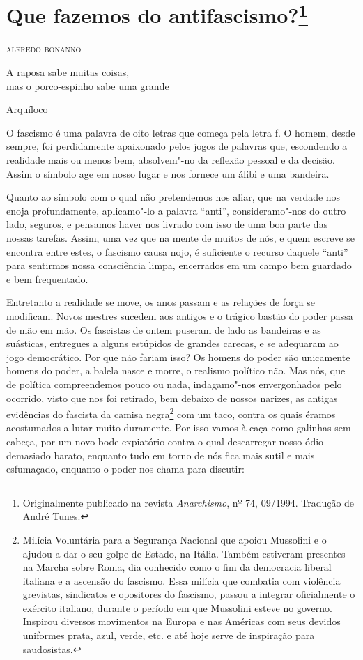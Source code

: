 \chapter{Que fazemos do antifascismo?\footnote[*]{Originalmente publicado na revista \emph{Anarchismo}, nº 74, 09/1994. Tradução de André Tunes.}}

\hfill{}\textsc{alfredo bonanno}

\bigskip

\epigraph{A raposa sabe muitas coisas,\\mas o porco-espinho sabe uma grande}{Arquíloco}


O fascismo é uma palavra de oito letras que começa pela letra f. O
homem, desde sempre, foi perdidamente apaixonado pelos jogos de palavras
que, escondendo a realidade mais ou menos bem, absolvem"-no da reflexão
pessoal e da decisão. Assim o símbolo age em nosso lugar e nos fornece
um álibi e uma bandeira.

Quanto ao símbolo com o qual não pretendemos nos aliar, que na verdade
nos enoja profundamente, aplicamo"-lo a palavra ``anti'', consideramo"-nos
do outro lado, seguros, e pensamos haver nos livrado com isso de uma boa
parte das nossas tarefas. Assim, uma vez que na mente de muitos de nós,
e quem escreve se encontra entre estes, o fascismo causa nojo, é
suficiente o recurso daquele ``anti'' para sentirmos nossa consciência
limpa, encerrados em um campo bem guardado e bem frequentado.

Entretanto a realidade se move, os anos passam e as relações de força se
modificam. Novos mestres sucedem aos antigos e o trágico bastão do poder
passa de mão em mão. Os fascistas de ontem puseram de lado as bandeiras
e as suásticas, entregues a alguns estúpidos de grandes carecas, e se
adequaram ao jogo democrático. Por que não fariam isso? Os homens do
poder são unicamente homens do poder, a balela nasce e morre, o realismo
político não. Mas nós, que de política compreendemos pouco ou nada,
indagamo"-nos envergonhados pelo ocorrido, visto que nos foi retirado,
bem debaixo de nossos narizes, as antigas evidências do fascista da
camisa negra\footnote{Milícia Voluntária para a Segurança Nacional que apoiou Mussolini e o
  ajudou a dar o seu golpe de Estado, na Itália. Também estiveram
  presentes na Marcha sobre Roma, dia conhecido como o fim da democracia
  liberal italiana e a ascensão do fascismo. Essa milícia que combatia
  com violência grevistas, sindicatos e opositores do fascismo, passou a
  integrar oficialmente o exército italiano, durante o período em que
  Mussolini esteve no governo. Inspirou diversos movimentos na Europa e
  nas Américas com seus devidos uniformes prata, azul, verde, etc. e até
  hoje serve de inspiração para saudosistas.} com um taco, contra os quais éramos acostumados a lutar
muito duramente. Por isso vamos à caça como galinhas sem cabeça, por um
novo bode expiatório contra o qual descarregar nosso ódio demasiado
barato, enquanto tudo em torno de nós fica mais sutil e mais esfumaçado,
enquanto o poder nos chama para discutir:

